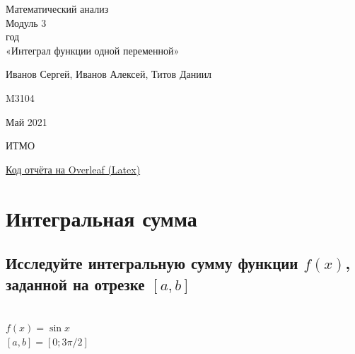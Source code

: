 \documentclass{article}
\begin{document}
\begin{center}
\hfill \break

\LARGE{Математический анализ}\\
\hfill \break
\normalsize{Модуль 3\\
\hfill {} год\\
\hfill \break
«Интеграл функции одной переменной»}\\
\hfill \break
\hfill \break
\hfill \break
\hfill \break
\end{center}

\begin{flushright} Иванов Сергей, Иванов Алексей, Титов Даниил \end{flushright}
\begin{flushright} M3104 \end{flushright}
\vfill
\bigskip
\begin{center} Май 2021 \end{center}
\begin{center} ИТМО \end{center}
\thispagestyle{empty} %
\newpage
\tableofcontents{}
\vfill
\bigskip
\begin{flushright} \href{https://www.overleaf.com/read/sbhfmhchwxzh}{Код отчёта на Overleaf (Latex)} \end{flushright}
\newpage
\section{Интегральная сумма}
\normalsize
\subsection{Исследуйте интегральную сумму функции $f(x)$, заданной на отрезке $[a, b]$}
\\
$ f(x) = \sin{x} $\\
$ [a, b] = [0; 3\pi/2] $\\
\end{document}
